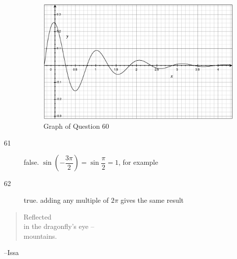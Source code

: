 \documentclass[fleqn,addpoints]{exam}
\begin{document}
\begin{description}
\begin{figure}[H]
  \centering
  \includegraphics[scale=.3]{question60.eps}
  \caption*{Graph of Question 60}
\end{figure}

\item[61]
false.  $\sin \left( - \dfrac{3 \pi}{2} \right) = \sin \dfrac{\pi}{2} = 1$, for example

\item[62]
true.  adding any multiple of $2 \pi$ gives the same result

\end{description}

\else

\vspace{3 in}

\begin{em}
\begin{verse}
Reflected \\
in the dragonfly's eye -- \\
mountains.
\end{verse}
\end{em}
\hspace{1.5 cm} --Issa

\fi
\end{document}
